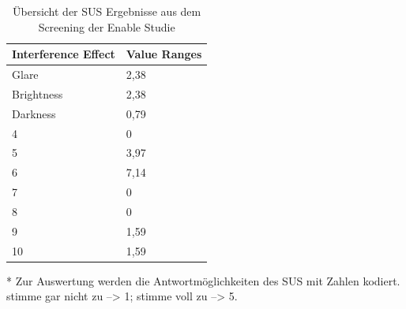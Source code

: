 \documentclass[11pt, a4paper,onecolumn ,titlepage]{article}
\begin{document}
    \begin{table}[H]
        \caption{Übersicht der SUS Ergebnisse aus dem Screening der Enable Studie}
        \label{tab:sus-ergebnisse-screening}
        \centering
        \begin{threeparttable}
            \begin{tabularx}{\linewidth}{|X|X|}
                \hline
                \textbf{Interference Effect} & \textbf{Value Ranges} \\
                \hline
                Glare                        & 2,38                  \\
                \hline
                Brightness\tnote{1}          & 2,38                  \\
                \hline
                Darkness                     & 0,79                  \\
                \hline
                4                            & 0                     \\
                \hline
                5\tnote{1}                   & 3,97                  \\
                \hline
                6\tnote{1}                   & 7,14                  \\
                \hline
                7                            & 0                     \\
                \hline
                8                            & 0                     \\
                \hline
                9                            & 1,59                  \\
                \hline
                10                           & 1,59                  \\
                \hline
            \end{tabularx}

            \begin{tablenotes}
                \item[*] Zur Auswertung werden die Antwortmöglichkeiten des SUS mit Zahlen kodiert. stimme gar nicht zu --> 1; stimme voll zu --> 5.
            \end{tablenotes}
        \end{threeparttable}
    \end{table}

\printbibliography
\end{document}
